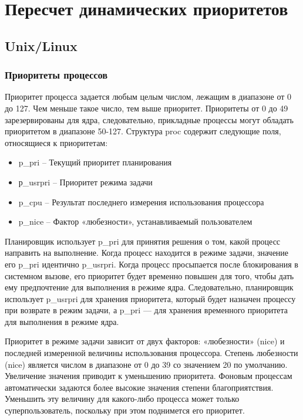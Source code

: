 \chapter{Пересчет динамических приоритетов}

    \section{Unix/Linux}
    
        \subsection{Приоритеты процессов}
        
            Приоритет  процесса  задается  любым  целым  числом,  лежащим  в  диапазоне  от  0  до  127.  Чем  меньше  такое  число,  тем  выше  приоритет.  Приоритеты  от  0  до  49  зарезервированы  для  ядра,  следовательно, прикладные  процессы  могут  обладать  приоритетом  в  диапазоне  50-127.  Структура  proc  содержит  следующие  поля,  относящиеся  к  приоритетам: 
            
            \begin{itemize}
                \item p\_pri -- Текущий  приоритет  планирования
                \item р\_usrpri -- Приоритет  режима  задачи 
                \item p\_cpu -- Результат  последнего  измерения  использования  процессора 
                \item p\_nice -- Фактор  «любезности»,  устанавливаемый  пользователем 
            \end{itemize}
        
            Планировщик  использует  p\_pri  для  принятия  решения  о  том,  какой  процесс  направить  на  выполнение.  Когда  процесс  находится  в  режиме  задачи,  значение  его  p\_pri  идентично  p\_usrpri.  Когда  процесс  просыпается  после  блокирования  в  системном  вызове,  его  приоритет  будет  временно  повышен  для  того,  чтобы  дать  ему  предпочтение  для  выполнения  в  режиме  ядра.  Следовательно,  планировщик  использует  p\_usrpri  для  хранения  приоритета,  который  будет  назначен  процессу  при  возврате  в  режим  задачи,  а  p\_pri —  для  хранения  временного  приоритета  для  выполнения  в  режиме  ядра.
            
            Приоритет  в  режиме  задачи  зависит  от  двух  факторов:  «любезности»  (nice)  и  последней  измеренной  величины  использования  процессора.  Степень  любезности  (nice)  является  числом  в  диапазоне  от  0  до  39  со  значением  20  по  умолчанию.  Увеличение  значения  приводит  к  уменьшению  приоритета.  Фоновым  процессам  автоматически  задаются  более  высокие  значения  степени  благоприятствия.  Уменьшить  эту  величину  для  какого-либо  процесса  может  только  суперпользователь,  поскольку  при  этом  поднимется  его  приоритет.
            
